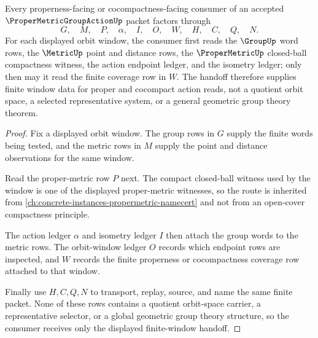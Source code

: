 \begin{theorem}
\label{thm:proper-metric-group-action-finite-window-handoff}
Every properness-facing or cocompactness-facing consumer of an accepted $\ProperMetricGroupActionUp$ packet factors through
$$
G,\quad M,\quad P,\quad \alpha,\quad I,\quad O,\quad W,\quad H,\quad C,\quad Q,\quad N .
$$
For each displayed orbit window, the consumer first reads the $\GroupUp$ word rows, the $\MetricUp$ point and distance rows, the $\ProperMetricUp$ closed-ball compactness witness, the action endpoint ledger, and the isometry ledger; only then may it read the finite coverage row in $W$. The handoff therefore supplies finite window data for proper and cocompact action reads, not a quotient orbit space, a selected representative system, or a general geometric group theory theorem.
\end{theorem}
\begin{proof}
Fix a displayed orbit window. The group rows in $G$ supply the finite words being tested, and the metric rows in $M$ supply the point and distance observations for the same window.

Read the proper-metric row $P$ next. The compact closed-ball witness used by the window is one of the displayed proper-metric witnesses, so the route is inherited from \autoref{ch:concrete-instances-propermetric-namecert} and not from an open-cover compactness principle.

The action ledger $\alpha$ and isometry ledger $I$ then attach the group words to the metric rows. The orbit-window ledger $O$ records which endpoint rows are inspected, and $W$ records the finite properness or cocompactness coverage row attached to that window.

Finally use $H,C,Q,N$ to transport, replay, source, and name the same finite packet. None of these rows contains a quotient orbit-space carrier, a representative selector, or a global geometric group theory structure, so the consumer receives only the displayed finite-window handoff.
\end{proof}


